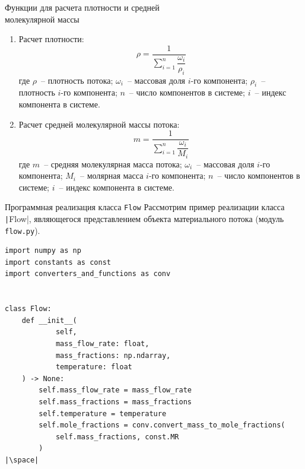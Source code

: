 \documentclass[aspectratio=169, mathserif]{beamer}	%
\begin{document}
\begin{frame}[fragile]{Функции для расчета плотности и средней \\ молекулярной массы}
\scriptsize
\begin{enumerate}
\item Расчет плотности:
\vfill
\begin{equation*}
	\rho = \dfrac{1}{\sum \limits_{i=1}^{n}\dfrac{\omega_i}{\rho_i}}
\end{equation*}
\vfill
где $\rho$~-- плотность потока; $\omega _i$~-- массовая доля $i$-го компонента; $\rho _i$~-- плотность $i$-го компонента; $n$~-- число компонентов в системе; $i$~-- индекс компонента в системе.
\vfill
\item Расчет средней молекулярной массы потока:
\vfill
$$
	m = \dfrac{1}{\sum \limits_{i=1}^{n}\dfrac{\omega_i}{M_i}}
$$
\vfill
где $m$~-- средняя молекулярная масса потока; $\omega _i$~-- массовая доля $i$-го компонента; $M_i$~-- молярная масса $i$-го компонента; $n$~-- число компонентов в системе; $i$~-- индекс компонента в системе.
\vfill
\end{enumerate}
\vfill
\end{frame}

\begin{frame}[fragile]{Программная реализация класса \texttt{Flow}}
\scriptsize
Рассмотрим пример реализации класса \texttt|Flow|, являющегося представлением объекта материального потока (модуль \texttt{flow.py}).
\vfill
\begin{verbatim}
import numpy as np
import constants as const
import converters_and_functions as conv


class Flow:
    def __init__(
            self,
            mass_flow_rate: float,
            mass_fractions: np.ndarray,
            temperature: float
    ) -> None:
        self.mass_flow_rate = mass_flow_rate
        self.mass_fractions = mass_fractions
        self.temperature = temperature
        self.mole_fractions = conv.convert_mass_to_mole_fractions(
            self.mass_fractions, const.MR
        )
|\space|
\end{verbatim}
\vfill
\end{frame}
\end{document}
